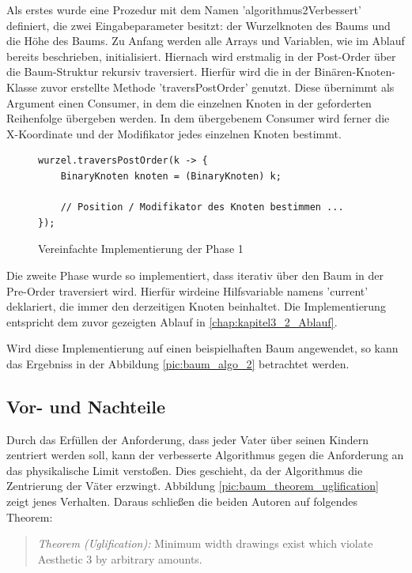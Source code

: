 Als erstes wurde eine Prozedur mit dem Namen 
'algorithmus2Verbessert' definiert, die zwei Eingabeparameter besitzt: der Wurzelknoten des Baums 
und die Höhe des Baums. Zu Anfang werden alle Arrays und Variablen, wie im Ablauf 
bereits beschrieben, initialisiert. Hiernach wird erstmalig in der Post-Order über 
die Baum-Struktur rekursiv traversiert. Hierfür wird die in der Binären-Knoten-Klasse 
zuvor erstellte Methode 'traversPostOrder' genutzt. Diese übernimmt als Argument einen Consumer, 
in dem die einzelnen Knoten in der geforderten Reihenfolge übergeben werden. In dem übergebenem Consumer 
wird ferner die X-Koordinate und der Modifikator jedes einzelnen Knoten bestimmt.

\begin{figure}
\begin{lstlisting}
wurzel.traversPostOrder(k -> {
    BinaryKnoten knoten = (BinaryKnoten) k;

    // Position / Modifikator des Knoten bestimmen ...
});
\end{lstlisting}
    \caption{Vereinfachte Implementierung der Phase 1}
    \label{code:algo2_phase1}
\end{figure}

Die zweite Phase wurde so implementiert, dass iterativ über den Baum in der Pre-Order traversiert 
wird. Hierfür wirdeine Hilfsvariable namens 'current' deklariert, die immer den derzeitigen Knoten beinhaltet. 
Die Implementierung entspricht dem zuvor gezeigten Ablauf in \ref{chap:kapitel3_2_Ablauf}. 

Wird diese Implementierung auf einen beispielhaften Baum angewendet, so kann das Ergebniss
in der Abbildung \ref{pic:baum_algo_2} betrachtet werden.


\subsection{Vor- und Nachteile}
Durch das Erfüllen der Anforderung, dass jeder Vater über seinen Kindern zentriert werden soll, kann der verbesserte Algorithmus gegen
die Anforderung an das physikalische Limit verstoßen. Dies geschieht, da der Algorithmus die Zentrierung der Väter erzwingt.
Abbildung \ref{pic:baum_theorem_uglification} zeigt jenes Verhalten. Daraus schließen die beiden Autoren auf folgendes Theorem:

\begin{quotation}
	\textit{Theorem (Uglification):} Minimum width drawings exist which violate Aesthetic 3 by arbitrary amounts.\cite[]{q1}
\end{quotation}

